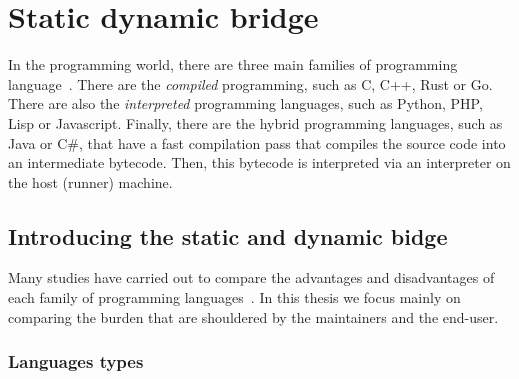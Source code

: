 \chapter{Static dynamic bridge}
\label{chap:static_dynamic_bridge}


In the programming world, there are three main families of programming language~\parencite{kwame.2017.qualitative}.
There are the \emph{compiled} programming, such as C, C++, Rust or Go. There are also the \emph{interpreted} programming
languages, such as Python, PHP, Lisp or Javascript. Finally, there are the hybrid programming languages, such as Java or
C\#, that have a fast compilation pass that compiles the source code into an intermediate bytecode. Then, this bytecode
is interpreted via an interpreter on the host (runner) machine.


\section{Introducing the static and dynamic bidge}

Many studies have carried out to compare the advantages and disadvantages of each family of programming
languages~\parencite{prechelt.2000.comparison,kwame.2017.qualitative,boehm.1984.economics}. In this thesis we focus
mainly on comparing the burden that are shouldered by the maintainers and the end-user.


\subsection{Languages types}


